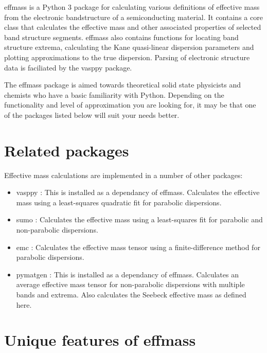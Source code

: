 effmass \autocite{Whalley2018b} is a Python 3 package for calculating various definitions of effective mass from the electronic bandstructure of a semiconducting material. It contains a core class that calculates the effective mass and other associated properties of selected band structure segments. effmass also contains functions for locating band structure extrema, calculating the Kane quasi-linear dispersion parameters and plotting approximations to the true dispersion. Parsing of electronic structure data is faciliated by the vasppy \autocite{Morgan2018} package.

The effmass package is aimed towards theoretical solid state physicists and chemists who have a basic familiarity with Python. Depending on the functionality and level of approximation you are looking for, it may be that one of the packages listed below will suit your needs better.

\section{Related packages}
\label{sec:related}

Effective mass calculations are implemented in a number of other packages:
\begin{itemize}
    \item vasppy \autocite{Morgan2018}: This is installed as a dependancy of effmass. Calculates the effective mass using a least-squares quadratic fit for parabolic dispersions.
    \item sumo \autocite{Ganose2018}: Calculates the effective mass using a least-squares fit for parabolic and non-parabolic dispersions.
    \item emc \autocite{Fornari2012}: Calculates the effective mass tensor using a finite-difference method for parabolic dispersions.
    \item pymatgen \autocite{Ong2013}: This is installed as a dependancy of effmass. Calculates an average effective mass tensor for non-parabolic dispersions with multiple bands and extrema. Also calculates the Seebeck effective mass as defined here.
\end{itemize}

\section{Unique features of effmass}
\label{sec:unique}

